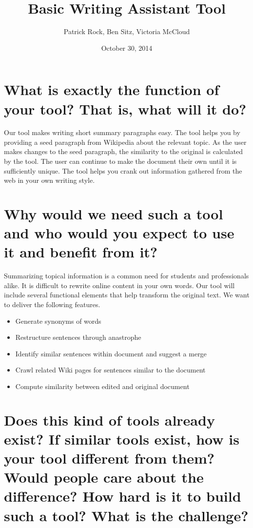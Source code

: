 \documentclass{article}
\title{Basic Writing Assistant Tool}
\author{Patrick Rock, Ben Sitz, Victoria McCloud}
\date{October 30, 2014}
\begin{document}
\maketitle

\section{What is exactly the function of your tool? That is, what will it do?}
\paragraph{}
Our tool makes writing short summary paragraphs easy. The tool helps you by providing a seed paragraph from Wikipedia about the relevant topic.
As the user makes changes to the seed paragraph, the similarity to the original is calculated by the tool. The user can continue to make the 
document their own until it is sufficiently unique. The tool helps you crank out information gathered from the web in your own writing style.

\section{Why would we need such a tool and who would you expect to use it and benefit from it?}
\paragraph{}
Summarizing topical information is a common need for students and professionals alike. It is difficult to 
rewrite online content in your own words. Our tool will include several functional elements that help transform
the original text. We want to deliver the following features.
\begin{itemize}
\item Generate synonyms of words
\item Restructure sentences through anastrophe
\item Identify similar sentences within document and suggest a merge
\item Crawl related Wiki pages for sentences similar to the document
\item Compute similarity between edited and original document
\end{itemize}

\section{Does this kind of tools already exist? If similar tools exist, how is your tool different from them? Would people care about the difference? How hard is it to build such a tool? What is the challenge?}
\end{document}
